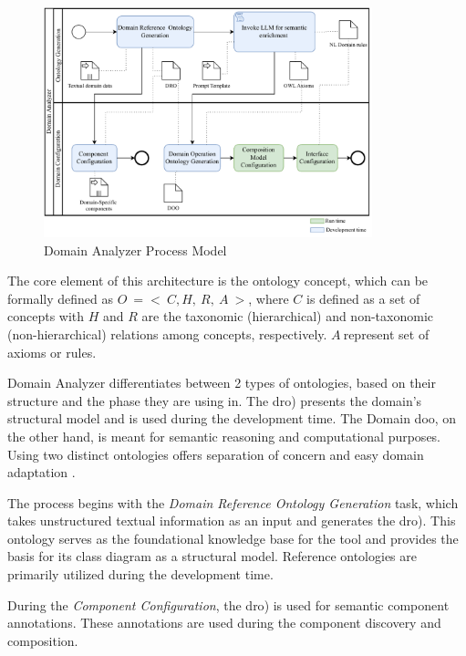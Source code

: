 \begin{figure}[hbt]
\hypertarget{fig:onto-da}{%
\centering
\includegraphics[width=0.85\textwidth]{../figures/MyFigures/DomainAnalyser.drawio.pdf}
\captionsetup{justification=centering}
\caption{Domain Analyzer Process Model}\label{fig:onto-da}
}
\end{figure}

The core element of this architecture is the ontology concept, which can
be formally defined as \(O\  = < \ C,H,\ R,\ A\  >\), where \(C\) is
defined as a set of concepts with \(H\) and \(R\) are the taxonomic
(hierarchical) and non-taxonomic (non-hierarchical) relations among
concepts, respectively. \(A\ \)represent set of axioms or rules.

Domain Analyzer differentiates between 2 types of ontologies, based on
their structure and the phase they are using in. The \gls{dro}) presents the domain's structural model and is used during
the development time. The Domain \gls{doo}, on the
other hand, is meant for semantic reasoning and computational purposes.
Using two distinct ontologies offers separation of concern and easy
domain adaptation \autocite{Haav2018}.

The process begins with the \emph{Domain Reference Ontology Generation}
task, which takes unstructured textual information as an input and
generates the \gls{dro}). This ontology serves as the foundational knowledge
base for the tool and provides the basis for its class diagram as a
structural model. Reference ontologies are primarily utilized during the
development time.

During the \emph{Component Configuration}, the \gls{dro}) is used for semantic
component annotations. These annotations are used during the component
discovery and composition.

